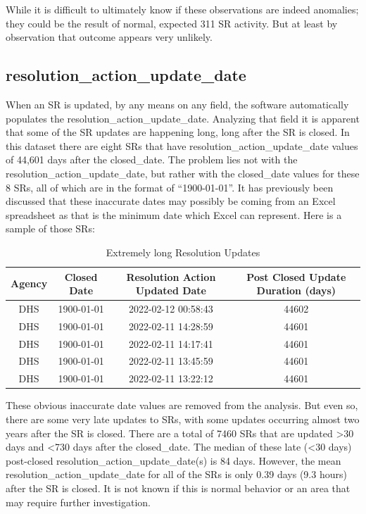 \documentclass[12pt, titlepage]{article}
\begin{document}
{	While it is difficult to ultimately know if these observations 
	are indeed anomalies; they could be the result of normal, 
	expected 311 SR activity. But at least by observation that 
	outcome appears very unlikely.	
		
	\subsection{resolution\_action\_update\_date}
	When an SR is updated, by any means on any field, the software 
	automatically populates the resolution\_action\_update\_date. 
	Analyzing that field it is apparent that some of the SR updates 
	are happening long, long after the SR is closed. In this dataset 
	there are eight SRs that have resolution\_action\_update\_date values 
	of 44,601 days after the closed\_date. The problem lies not with 
	the  resolution\_action\_update\_date, but rather with the closed\_date 
	values for these 8 SRs, all of which are in the format of ``1900-01-01''. 
	It has previously been discussed that these inaccurate dates may 
	possibly be coming from an Excel spreadsheet as that is the minimum 
	date which Excel can represent. Here is a sample of those SRs:

	\begin{table}[tbp]
	    \centering
	    \normalsize
	    \caption{Extremely long Resolution Updates}
	    \begin{tabular}{cccc}
	        \hline
	        Agency & Closed Date & Resolution Action Updated Date 
	        & Post Closed Update Duration (days) \\
	        \hline
	        DHS & 1900-01-01 & 2022-02-12 00:58:43 & 44602 \\
	        DHS & 1900-01-01 & 2022-02-11 14:28:59 & 44601 \\
	        DHS & 1900-01-01 & 2022-02-11 14:17:41 & 44601 \\
	        DHS & 1900-01-01 & 2022-02-11 13:45:59 & 44601 \\
	        DHS & 1900-01-01 & 2022-02-11 13:22:12 & 44601 \\
	        \hline
	    \end{tabular}
	    \label{tab:resolution-updates}
	\end{table}
	
	These obvious inaccurate date values are removed from the analysis. 
	But even so, there are some very late updates to SRs, with some 
	updates occurring almost two years after the SR is closed. There are a 
	total of 7460 SRs that are updated \textgreater30 days and \textless{}730 
	days after the closed\_date. The median of these late 
	(\textless{}30 days) post-closed resolution\_action\_update\_date(s) is 
	84 days. However, the mean resolution\_action\_update\_date for 
	all of the SRs is only 0.39 days (9.3 hours) after the SR is closed. 
	It is not known if this is normal behavior or an area that may 
	require further investigation. 
	
}
\end{document}
